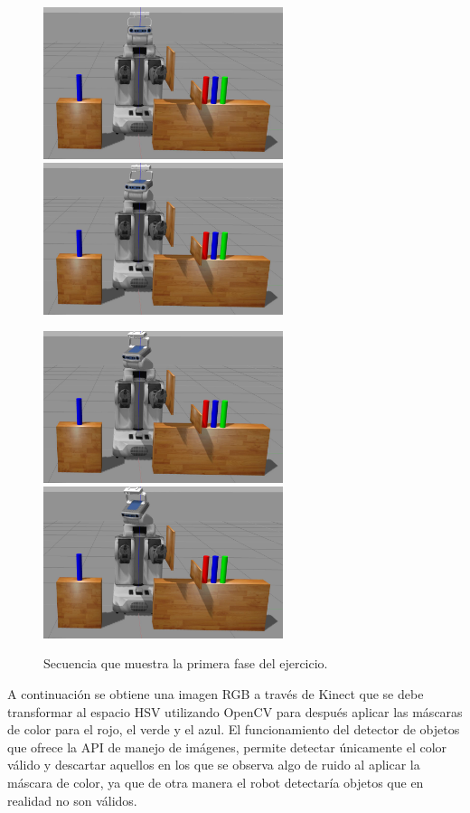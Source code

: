 \documentclass[12pt,spanish,chapterprefix, numbers=noenddot]{book}
\numberwithin{equation}{section}
\numberwithin{figure}{section}
\begin{document}
\begin{figure}[hbt!]
\centering
\includegraphics[width=7cm]{Figs/frame1.png}
\includegraphics[width=7cm]{Figs/frame161.png}
\par
\centering
\includegraphics[width=7cm]{Figs/frame195.png}
\includegraphics[width=7cm]{Figs/frame358.png}
\par
\caption{\label{fig:fase1}Secuencia que muestra la primera fase del ejercicio.}
\end{figure}

A continuación se obtiene una imagen RGB a través de Kinect que se debe transformar al espacio HSV utilizando OpenCV para después aplicar las máscaras de color para el rojo, el verde y el azul. El funcionamiento del detector de objetos que ofrece la API de manejo de imágenes, permite detectar únicamente el color válido y descartar aquellos en los que se observa algo de ruido al aplicar la máscara de color, ya que de otra manera el robot detectaría objetos que en realidad no son válidos.
\end{document}

